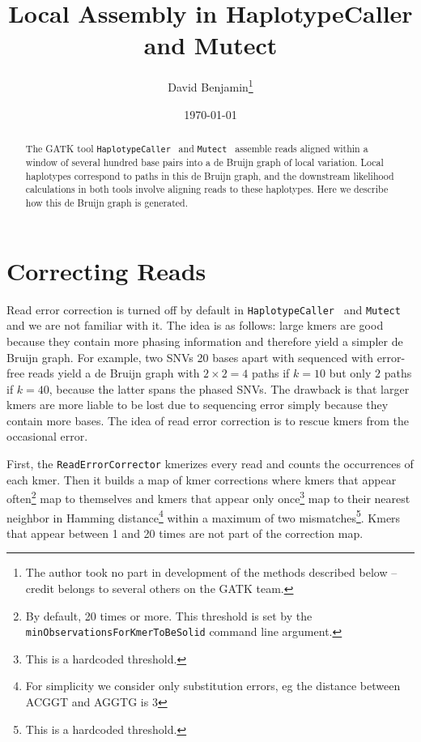 \documentclass[nofootinbib,amssymb,amsmath]{revtex4}
\newcommand{\HC}{\texttt{HaplotypeCaller}}
\newcommand{\Mutect}{\texttt{Mutect}}
\newcommand{\code}[1]{\texttt{#1}}
\begin{document}
\title{Local Assembly in HaplotypeCaller and Mutect}
\author{David Benjamin\footnote{The author took no part in development of the methods described below -- credit belongs to several others on the GATK team. }}

\date{\today}

\begin{abstract}
The GATK tool \HC~ and \Mutect~ assemble reads aligned within a window of several hundred base pairs into a de Bruijn graph of local variation.  Local haplotypes correspond to paths in this de Bruijn graph, and the downstream likelihood calculations in both tools involve aligning reads to these haplotypes.  Here we describe how this de Bruijn graph is generated.
\end{abstract}

\maketitle

\section{Correcting Reads} \label{correcting-reads}
Read error correction is turned off by default in \HC~ and \Mutect~ and we are not familiar with it.  The idea is as follows: large kmers are good because they contain more phasing information and therefore yield a simpler de Bruijn graph.  For example, two SNVs 20 bases apart with sequenced with error-free reads yield a de Bruijn graph with $2 \times 2 = 4$ paths if $k = 10$ but only $2$ paths if $k = 40$, because the latter spans the phased SNVs.  The drawback is that larger kmers are more liable to be lost due to sequencing error simply because they contain more bases.  The idea of read error correction is to rescue kmers from the occasional error.

First, the \code{ReadErrorCorrector} kmerizes every read and counts the occurrences of each kmer.  Then it builds a map of kmer corrections where kmers that appear often\footnote{By default, 20 times or more.  This threshold is set by the \code{minObservationsForKmerToBeSolid} command line argument.} map to themselves and kmers that appear only once\footnote{This is a hardcoded threshold.} map to their nearest neighbor in Hamming distance\footnote{For simplicity we consider only substitution errors, eg the distance between ACGGT and AGGTG is 3} within a maximum of two mismatches\footnote{This is a hardcoded threshold.}.  Kmers that appear between 1 and 20 times are not part of the correction map.
\end{document}
